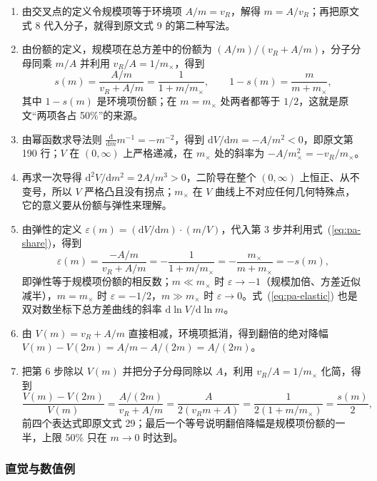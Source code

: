 \begin{enumerate}
\item 由交叉点的定义令规模项等于环境项 $A/m=v_R$，解得 $m=A/v_R$；再把原文式 8 代入分子，就得到原文式 9 的第二种写法。
\item 由份额的定义，规模项在总方差中的份额为 $(A/m)/(v_R+A/m)$，分子分母同乘 $m/A$ 并利用 $v_R/A=1/m_\times$，得到
\begin{equation}
s(m)=\frac{A/m}{v_R+A/m}=\frac{1}{1+m/m_\times},\qquad 1-s(m)=\frac{m}{m+m_\times},
\label{eq:pa-share}
\end{equation}
其中 $1-s(m)$ 是环境项份额；在 $m=m_\times$ 处两者都等于 $1/2$，这就是原文“两项各占 50\%”的来源。
\item 由幂函数求导法则 $\frac{\mathrm d}{\mathrm dm}m^{-1}=-m^{-2}$，得到 $\mathrm dV/\mathrm dm=-A/m^2<0$，即原文第 190 行；$V$ 在 $(0,\infty)$ 上严格递减，在 $m_\times$ 处的斜率为 $-A/m_\times^2=-v_R/m_\times$。
\item 再求一次导得 $\mathrm d^2V/\mathrm dm^2=2A/m^3>0$，二阶导在整个 $(0,\infty)$ 上恒正、从不变号，所以 $V$ 严格凸且没有拐点；$m_\times$ 在 $V$ 曲线上不对应任何几何特殊点，它的意义要从份额与弹性来理解。
\item 由弹性的定义 $\varepsilon(m)=(\mathrm dV/\mathrm dm)\cdot(m/V)$，代入第 3 步并利用式~(\ref{eq:pa-share})，得到
\begin{equation}
\varepsilon(m)=\frac{-A/m}{v_R+A/m}=-\frac{1}{1+m/m_\times}=-\frac{m_\times}{m+m_\times}=-s(m),
\label{eq:pa-elastic}
\end{equation}
即弹性等于规模项份额的相反数；$m\ll m_\times$ 时 $\varepsilon\to-1$（规模加倍、方差近似减半），$m=m_\times$ 时 $\varepsilon=-1/2$，$m\gg m_\times$ 时 $\varepsilon\to0$。式~(\ref{eq:pa-elastic}) 也是双对数坐标下总方差曲线的斜率 $\mathrm d\ln V/\mathrm d\ln m$。
\item 由 $V(m)=v_R+A/m$ 直接相减，环境项抵消，得到翻倍的绝对降幅 $V(m)-V(2m)=A/m-A/(2m)=A/(2m)$。
\item 把第 6 步除以 $V(m)$ 并把分子分母同除以 $A$，利用 $v_R/A=1/m_\times$ 化简，得到
\begin{equation}
\frac{V(m)-V(2m)}{V(m)}=\frac{A/(2m)}{v_R+A/m}=\frac{A}{2(v_Rm+A)}=\frac{1}{2(1+m/m_\times)}=\frac{s(m)}{2},
\label{eq:pa-halving}
\end{equation}
前四个表达式即原文式 29；最后一个等号说明翻倍降幅是规模项份额的一半，上限 50\% 只在 $m\to0$ 时达到。
\end{enumerate}

\subsubsection{直觉与数值例}

